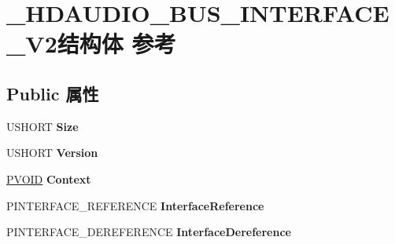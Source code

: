 \hypertarget{struct___h_d_a_u_d_i_o___b_u_s___i_n_t_e_r_f_a_c_e___v2}{}\section{\+\_\+\+H\+D\+A\+U\+D\+I\+O\+\_\+\+B\+U\+S\+\_\+\+I\+N\+T\+E\+R\+F\+A\+C\+E\+\_\+\+V2结构体 参考}
\label{struct___h_d_a_u_d_i_o___b_u_s___i_n_t_e_r_f_a_c_e___v2}
\subsection*{Public 属性}
\begin{DoxyCompactItemize}
\item 
\mbox{\label{struct___h_d_a_u_d_i_o___b_u_s___i_n_t_e_r_f_a_c_e___v2_a6bd5249bd3b9a8aa484715ee8a415cc1}} 
U\+S\+H\+O\+RT {\bfseries Size}
\item 
\mbox{\label{struct___h_d_a_u_d_i_o___b_u_s___i_n_t_e_r_f_a_c_e___v2_af36347e0fce7e2499003c20b056eebed}} 
U\+S\+H\+O\+RT {\bfseries Version}
\item 
\mbox{\label{struct___h_d_a_u_d_i_o___b_u_s___i_n_t_e_r_f_a_c_e___v2_a6ef05122948450083da27fdd736eb7df}} 
\hyperlink{interfacevoid}{P\+V\+O\+ID} {\bfseries Context}
\item 
\mbox{\label{struct___h_d_a_u_d_i_o___b_u_s___i_n_t_e_r_f_a_c_e___v2_a19182aca57f292c4f0f6186fea95a8b5}} 
P\+I\+N\+T\+E\+R\+F\+A\+C\+E\+\_\+\+R\+E\+F\+E\+R\+E\+N\+CE {\bfseries Interface\+Reference}
\item 
\mbox{\label{struct___h_d_a_u_d_i_o___b_u_s___i_n_t_e_r_f_a_c_e___v2_ac24fe1641fb3d81de2907acb89fd0d85}} 
P\+I\+N\+T\+E\+R\+F\+A\+C\+E\+\_\+\+D\+E\+R\+E\+F\+E\+R\+E\+N\+CE {\bfseries Interface\+Dereference}
\item 
\mbox{\label{struct___h_d_a_u_d_i_o___b_u_s___i_n_t_e_r_f_a_c_e___v2_ac287dc6a261cfd159294bc5928a41e37}} 

\end{DoxyCompactItemize}
